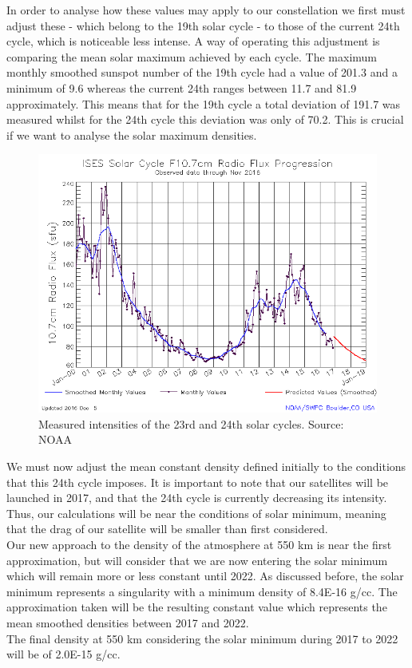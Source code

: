 \documentclass{article}
\begin{document}
In order to analyse how these values may apply to our constellation we first must adjust these - which belong to the 19th solar cycle - to those of the current 24th cycle, which is noticeable less intense. A way of operating this adjustment is comparing the mean solar maximum achieved by each cycle. The maximum monthly smoothed sunspot number of the 19th cycle had a value of 201.3 and a minimum of 9.6 whereas the current 24th ranges between 11.7 and 81.9 approximately. This means that for the 19th cycle a total deviation of 191.7 was measured whilst for the 24th cycle this deviation was only of 70.2. This is crucial if we want to analyse the solar maximum densities.  \\

\begin{figure}[h]
\includegraphics[width=14cm]{24solar}
\centering
\caption{Measured intensities of the 23rd and 24th solar cycles. Source: NOAA}
\label{figure4}
\end{figure}

We must now adjust the mean constant density defined initially to the conditions that this 24th cycle imposes. It is important to note that our satellites will be launched in 2017, and that the 24th cycle is currently decreasing its intensity. Thus, our calculations will be near the conditions of solar minimum, meaning that the drag of our satellite will be smaller than first considered. \\

Our new approach to the density of the atmosphere at 550 km is near the first approximation, but will consider that we are now entering the solar minimum which will remain more or less constant until 2022. As discussed before, the solar minimum represents a singularity with a minimum density of 8.4E-16 g/cc. The approximation taken will be the resulting constant value which represents the mean smoothed densities between 2017 and 2022. \\

The final density at 550 km considering the solar minimum during 2017 to 2022 will be of 2.0E-15 g/cc. 
\end{document}
